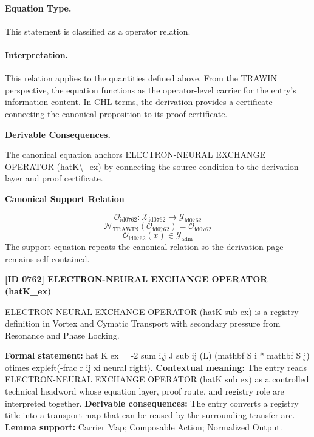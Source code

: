 \paragraph{Equation Type.}
This statement is classified as a operator relation.

\paragraph{Interpretation.}
This relation applies to the quantities defined above. From the TRAWIN perspective, the equation functions as the operator-level carrier for the entry’s information content. In CHL terms, the derivation provides a certificate connecting the canonical proposition to its proof certificate.

\par\vspace{0.35em}
\noindent\textbf{Derivable Consequences.}\quad
\begingroup
\footnotesize
\raggedright
The canonical equation anchors ELECTRON-NEURAL EXCHANGE OPERATOR (hatK\textbackslash{}\_ex) by connecting the source condition to the derivation layer and proof certificate.
\par\endgroup

\noindent\textbf{Canonical Support Relation}\par
\[
\mathcal{O}_{\mathrm{id0762}}:\mathcal{X}_{\mathrm{id0762}}\longrightarrow\mathcal{Y}_{\mathrm{id0762}}
\]
\[
\mathcal{N}_{\mathrm{TRAWIN}}(\mathcal{O}_{\mathrm{id0762}})=\mathcal{O}_{\mathrm{id0762}}
\]
\[
\mathcal{O}_{\mathrm{id0762}}(x)\in\mathcal{Y}_{\mathrm{adm}}
\]
\noindent The support equation repeats the canonical relation so the derivation page remains self-contained.\par

\clearpage
\noindent\textbf{[ID 0762] ELECTRON-NEURAL EXCHANGE OPERATOR (hatK\_ex)}\par
\vspace{0.35em}
\begingroup\small
{}
ELECTRON-NEURAL EXCHANGE OPERATOR (hatK sub ex) is a registry definition in Vortex and Cymatic Transport with secondary pressure from Resonance and Phase Locking.

\begingroup\footnotesize\setlength{\emergencystretch}{3em}\sloppy
\textbf{Formal statement:} hat K ex = -2 sum i,j J sub ij (L) (mathbf S i * mathbf S j) otimes expleft(-frac r ij xi neural right). \textbf{Contextual meaning:} The entry reads ELECTRON-NEURAL EXCHANGE OPERATOR (hatK sub ex) as a controlled technical headword whose equation layer, proof route, and registry role are interpreted together. \textbf{Derivable consequences:} The entry converts a registry title into a transport map that can be reused by the surrounding transfer arc. \textbf{Lemma support:} Carrier Map; Composable Action; Normalized Output.\par
\endgroup


